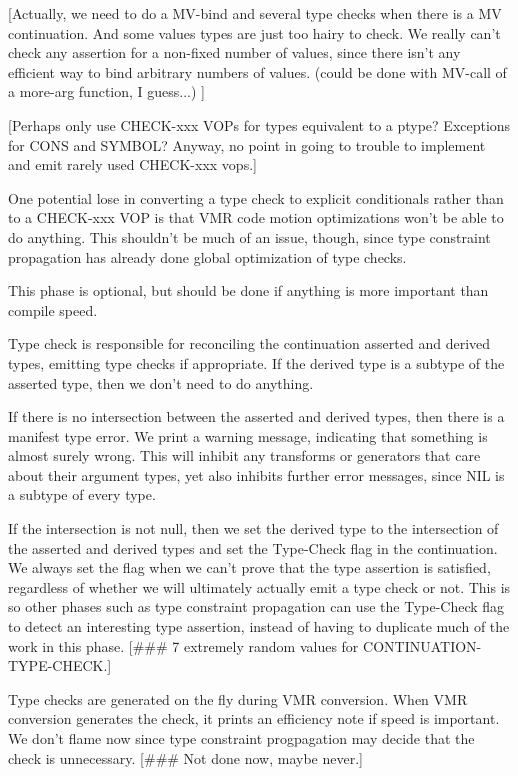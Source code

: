 [Actually, we need to do a MV-bind and several type checks when there is a MV
continuation.  And some values types are just too hairy to check.  We really
can't check any assertion for a non-fixed number of values, since there isn't
any efficient way to bind arbitrary numbers of values.  (could be done with
MV-call of a more-arg function, I guess...)
]

[Perhaps only use CHECK-xxx VOPs for types equivalent to a ptype?  Exceptions
for CONS and SYMBOL?  Anyway, no point in going to trouble to implement and
emit rarely used CHECK-xxx vops.]

One potential lose in converting a type check to explicit conditionals rather
than to a CHECK-xxx VOP is that VMR code motion optimizations won't be able to
do anything.  This shouldn't be much of an issue, though, since type constraint
propagation has already done global optimization of type checks.


This phase is optional, but should be done if anything is more important than
compile speed.  

Type check is responsible for reconciling the continuation asserted and derived
types, emitting type checks if appropriate.  If the derived type is a subtype
of the asserted type, then we don't need to do anything.

If there is no intersection between the asserted and derived types, then there
is a manifest type error.  We print a warning message, indicating that
something is almost surely wrong.  This will inhibit any transforms or
generators that care about their argument types, yet also inhibits further
error messages, since NIL is a subtype of every type.

If the intersection is not null, then we set the derived type to the
intersection of the asserted and derived types and set the Type-Check flag in
the continuation.  We always set the flag when we can't prove that the type
assertion is satisfied, regardless of whether we will ultimately actually emit
a type check or not.  This is so other phases such as type constraint
propagation can use the Type-Check flag to detect an interesting type
assertion, instead of having to duplicate much of the work in this phase.  
[\#\#\# 7 extremely random values for CONTINUATION-TYPE-CHECK.]

Type checks are generated on the fly during VMR conversion.  When VMR
conversion generates the check, it prints an efficiency note if speed is
important.  We don't flame now since type constraint progpagation may decide
that the check is unnecessary.  [\#\#\# Not done now, maybe never.]

